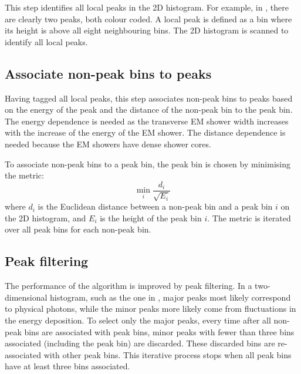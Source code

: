 This step identifies all local peaks in the 2D histogram. For example, in , there are clearly two peaks, both colour coded. A local peak is defined as a bin where its height is above all eight neighbouring bins. The 2D histogram is scanned to identify all local peaks. %

\subsection{Associate non-peak bins to peaks}

Having tagged all local peaks, this step associates non-peak bins to peaks based on the energy of the peak and the distance of the non-peak bin to the peak bin. The energy dependence is needed as the transverse EM shower width increases with the increase of the energy of the EM shower. The distance dependence is needed because the EM showers have dense shower cores.

To associate non-peak bins to a peak bin, the peak bin is chosen by minimising the metric:
\begin{equation}
\min_{i}\frac{d_{i}}{\sqrt{E_{i}}}
\end{equation}
where $d_{i}$ is the Euclidean distance between a non-peak bin and a  peak bin $i$ on the 2D histogram, and $E_{i}$ is the height of the peak bin $i$. The metric is iterated over all peak bins for each non-peak bin. %


\subsection{Peak filtering}

The performance of the \peakFinding algorithm is improved by peak filtering. In a two-dimensional histogram, such as the one in , major peaks most likely correspond to physical photons, while the minor peaks more likely come from fluctuations in the energy deposition. To select only the major peaks, every time after all non-peak bins are associated with peak bins, minor peaks with fewer than three bins associated (including the peak bin) are discarded. These discarded bins are re-associated with other peak bins. This iterative process stops when all peak bins have at least three bins associated.

